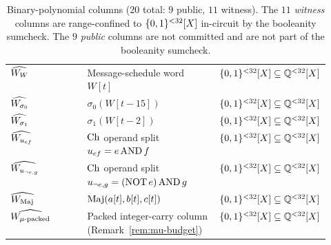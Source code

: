 \begin{table}[h]
\begin{tabularx}{\linewidth}{>{\raggedright\arraybackslash}p{0.24\linewidth} >{\raggedright\arraybackslash}X >{\raggedright\arraybackslash}p{0.30\linewidth}}
$\widehat{W_W}$              & Message-schedule word $W[t]$ & $\{0,1\}^{<32}[X] \subseteq \mathbb{Q}^{<32}[X]$ \\
$\widehat{W_{\sigma_0}}$     & $\sigma_0(W[t-15])$ & $\{0,1\}^{<32}[X] \subseteq \mathbb{Q}^{<32}[X]$ \\
$\widehat{W_{\sigma_1}}$     & $\sigma_1(W[t-2])$ & $\{0,1\}^{<32}[X] \subseteq \mathbb{Q}^{<32}[X]$ \\
$\widehat{W_{u_{ef}}}$       & $\operatorname{Ch}$ operand split $u_{ef} = e \operatorname{AND} f$ & $\{0,1\}^{<32}[X] \subseteq \mathbb{Q}^{<32}[X]$ \\
$\widehat{W_{u_{\neg e,g}}}$ & $\operatorname{Ch}$ operand split $u_{\neg e,g} = (\operatorname{NOT} e) \operatorname{AND} g$ & $\{0,1\}^{<32}[X] \subseteq \mathbb{Q}^{<32}[X]$ \\
$\widehat{W_{\operatorname{Maj}}}$         & $\operatorname{Maj}(a[t],b[t],c[t])$ & $\{0,1\}^{<32}[X] \subseteq \mathbb{Q}^{<32}[X]$ \\
$\widehat{W_{\mu\text{-packed}}}$ & Packed integer-carry column (Remark~\ref{rem:mu-budget}) & $\{0,1\}^{<32}[X] \subseteq \mathbb{Q}^{<32}[X]$ \\
\bottomrule
\end{tabularx}
\caption{Binary-polynomial columns ($20$ total: $9$ public, $11$ witness). The $11$ \emph{witness} columns are range-confined to $\{0,1\}^{<32}[X]$ in-circuit by the booleanity sumcheck. The $9$ \emph{public} columns are not committed and are not part of the booleanity sumcheck.}
\label{tab:bin-cols}
\end{table}

